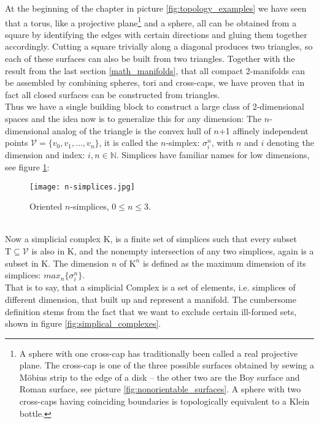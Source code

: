 At the beginning of the chapter in picture \ref{fig:topology_examples} we have seen that a torus, like a projective plane\footnote{ A sphere with one cross-cap has traditionally been called a real projective plane. The cross-cap is one of the three possible surfaces obtained by sewing a Möbius strip to the edge of a disk -- the other two are the Boy surface and Roman surface, see picture \ref{fig:nonorientable_surfaces}. A sphere with two cross-caps having coinciding boundaries is topologically equivalent to a Klein bottle.} and a sphere, all can be obtained from a
square by identifying the edges with certain directions and gluing them together accordingly.
Cutting a square trivially along a diagonal produces two triangles, so each of these surfaces can also be built from two triangles.
Together with the result from the last section \ref{math_manifolds}, that all compact 2-manifolds can be assembled by combining spheres, tori and cross-caps, we have proven that in fact all closed surfaces can be constructed from triangles.\\
Thus we have a single building block to construct a large class of 2-dimensional spaces and the idea now is to generalize this for any dimension:
The $n$-dimensional analog of the triangle is the convex hull of $n$+1 affinely independent points $\mathcal{V} = \{v_{0}, v_{1}, \dots , v_{n}\}$, it is called the $n$-simplex: $\sigma^{n}_{i}$, with $n$ and $i$ denoting the dimension and index: $i,n \in \mathbb{N}$.
Simplices have familiar names for low dimensions, see figure \ref{fig:n-simplices}:
\begin{figure}[ht]
\centering
\texttt{[image: n-simplices.jpg]}
\caption{Oriented $n$-simplices, $0 \leq n \leq 3$.}
\label{fig:n-simplices}
\end{figure}\\
Now a simplicial complex $\mathrm{K}$, is a finite set of simplices such that every subset $\mathrm{T} \subseteq \mathcal{V}$ is also in $\mathrm{K}$, and the nonempty intersection of any two simplices, again is a subset in $\mathrm{K}$.
The dimension $n$ of $\mathrm{K}^{n}$ is defined as the maximum dimension of its simplices: $max_{n}\{\sigma^{n}_{i}\}$.\\
That is to say, that a simplicial Complex is a set of elements, i.e. simplices of different dimension, that built up and represent a manifold.
The cumbersome definition stems from the fact that we want to exclude certain ill-formed sets, shown in figure \ref{fig:simplical_complexes}.\\
